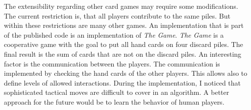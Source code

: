 The extensibility regarding other card games may require some modifications. The current restriction is, that all players contribute to the same piles. But within these restrictions are many other games. An implementation that is part of the published code is an implementation of \textit{The Game}. \textit{The Game} is a cooperative game with the goal to put all hand cards on four discard piles. The final result is the sum of cards that are not on the discard piles. An interesting factor is the communication between the players. The communication is implemented by checking the hand cards of the other players. This allows also to define levels of allowed interactions. During the implementation, I noticed that sophisticated tactical moves are difficult to cover in an algorithm. A better approach for the future would be to learn the behavior of human players.









